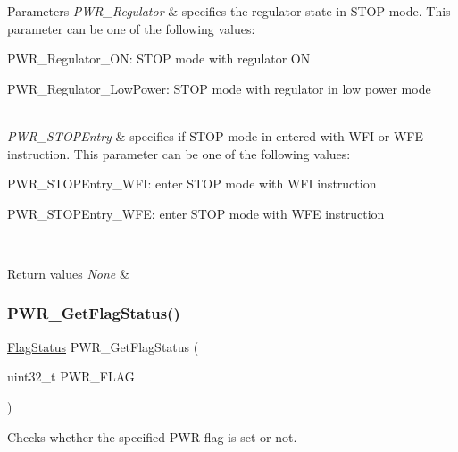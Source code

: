 \begin{DoxyParams}{Parameters}
{\em P\+W\+R\+\_\+\+Regulator} & specifies the regulator state in S\+T\+OP mode. This parameter can be one of the following values\+: \begin{DoxyItemize}
\item P\+W\+R\+\_\+\+Regulator\+\_\+\+ON\+: S\+T\+OP mode with regulator ON \item P\+W\+R\+\_\+\+Regulator\+\_\+\+Low\+Power\+: S\+T\+OP mode with regulator in low power mode \end{DoxyItemize}
\\
\hline
{\em P\+W\+R\+\_\+\+S\+T\+O\+P\+Entry} & specifies if S\+T\+OP mode in entered with W\+FI or W\+FE instruction. This parameter can be one of the following values\+: \begin{DoxyItemize}
\item P\+W\+R\+\_\+\+S\+T\+O\+P\+Entry\+\_\+\+W\+FI\+: enter S\+T\+OP mode with W\+FI instruction \item P\+W\+R\+\_\+\+S\+T\+O\+P\+Entry\+\_\+\+W\+FE\+: enter S\+T\+OP mode with W\+FE instruction \end{DoxyItemize}
\\
\hline
\end{DoxyParams}

\begin{DoxyRetVals}{Return values}
{\em None} & \\
\hline
\end{DoxyRetVals}
\mbox{\label{group___p_w_r___private___functions_gaa980163a4d83304280ee34942464b4ec}} 
\subsubsection{\texorpdfstring{PWR\_GetFlagStatus()}{PWR\_GetFlagStatus()}}
{\footnotesize\ttfamily \mbox{\hyperlink{group___exported__types_ga89136caac2e14c55151f527ac02daaff}{Flag\+Status}} P\+W\+R\+\_\+\+Get\+Flag\+Status (\begin{DoxyParamCaption}\item[{uint32\+\_\+t}]{P\+W\+R\+\_\+\+F\+L\+AG }\end{DoxyParamCaption})}



Checks whether the specified P\+WR flag is set or not. 


